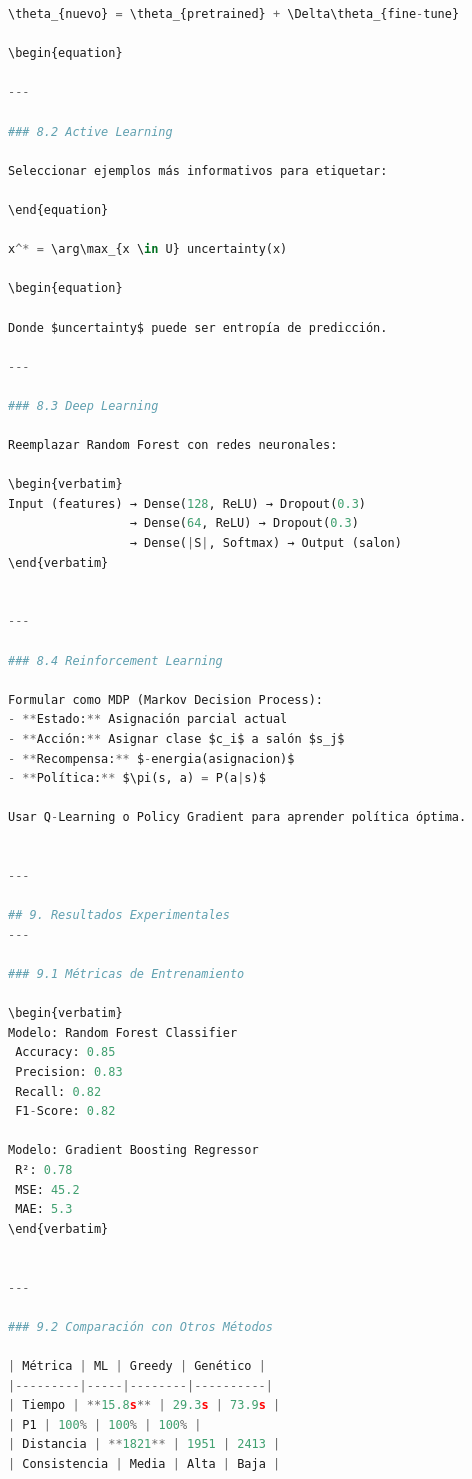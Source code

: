 \begin{itemize}
\begin{itemize}
\begin{itemize}
\begin{itemize}
\begin{itemize}
\begin{itemize}
\begin{enumerate}
\begin{enumerate}
\begin{enumerate}
\begin{enumerate}
\begin{lstlisting}[language=Python]
\theta_{nuevo} = \theta_{pretrained} + \Delta\theta_{fine-tune}

\begin{equation}

---

### 8.2 Active Learning

Seleccionar ejemplos más informativos para etiquetar:

\end{equation}

x^* = \arg\max_{x \in U} uncertainty(x)

\begin{equation}

Donde $uncertainty$ puede ser entropía de predicción.

---

### 8.3 Deep Learning

Reemplazar Random Forest con redes neuronales:

\begin{verbatim}
Input (features) → Dense(128, ReLU) → Dropout(0.3) 
                 → Dense(64, ReLU) → Dropout(0.3)
                 → Dense(|S|, Softmax) → Output (salon)
\end{verbatim}


---

### 8.4 Reinforcement Learning

Formular como MDP (Markov Decision Process):
- **Estado:** Asignación parcial actual
- **Acción:** Asignar clase $c_i$ a salón $s_j$
- **Recompensa:** $-energia(asignacion)$
- **Política:** $\pi(s, a) = P(a|s)$

Usar Q-Learning o Policy Gradient para aprender política óptima.


---

## 9. Resultados Experimentales
---

### 9.1 Métricas de Entrenamiento

\begin{verbatim}
Modelo: Random Forest Classifier
 Accuracy: 0.85
 Precision: 0.83
 Recall: 0.82
 F1-Score: 0.82

Modelo: Gradient Boosting Regressor
 R²: 0.78
 MSE: 45.2
 MAE: 5.3
\end{verbatim}


---

### 9.2 Comparación con Otros Métodos

| Métrica | ML | Greedy | Genético |
|---------|-----|--------|----------|
| Tiempo | **15.8s** | 29.3s | 73.9s |
| P1 | 100% | 100% | 100% |
| Distancia | **1821** | 1951 | 2413 |
| Consistencia | Media | Alta | Baja |


\end{lstlisting}
\end{enumerate}
\end{enumerate}
\end{enumerate}
\end{enumerate}
\end{itemize}
\end{itemize}
\end{itemize}
\end{itemize}
\end{itemize}
\end{itemize}
